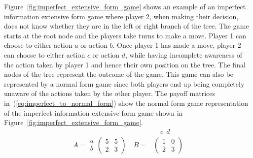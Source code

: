 Figure~\ref{fig:imperfect_extensive_form_game} shows an example of an imperfect
information extensive form game where player 2, when making their decision,
does not know whether they are in the left or right branch of the tree.
The game starts at the root node and the players take turns to make a move.
Player 1 can choose to either action \(a\) or action \(b\).
Once player 1 has made a move, player 2 can choose to either action \(c\) or
action \(d\), while having incomplete awareness of the action taken by player 1
and hence their own position on the tree.
The final nodes of the tree represent the outcome of the game.
This game can also be represented by a normal form game since both players end
up being completely unaware of the actions taken by the other player.
The payoff matrices in~(\ref{eq:imperfect_to_normal_form}) show the normal form
game representation of the imperfect information extensive form game shown in
Figure~\ref{fig:imperfect_extensive_form_game}.
\begin{align}\label{eq:imperfect_to_normal_form}
    & \quad c \ \ d \nonumber \\
    A =
    \begin{matrix}
        a \\
        b
    \end{matrix}
    \begin{pmatrix}
        5 & 5 \\
        2 & 3
    \end{pmatrix} \quad
    B =&
    \begin{pmatrix}
        1 & 0 \\
        2 & 3
    \end{pmatrix}
\end{align}
